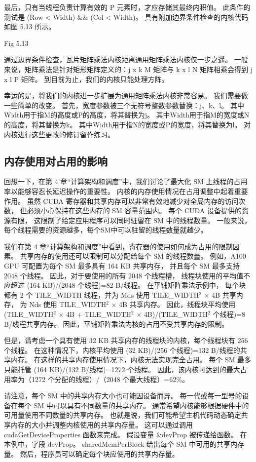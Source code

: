 最后，只有当线程负责计算有效的 P 元素时，才应存储其最终内积值。 
此条件的测试是 (Row < Width) \&\& (Col < Width)。 具有附加边界条件检查的内核代码如图 5.13 所示。

{\color{red} Fig 5.13}

通过边界条件检查，瓦片矩阵乘法内核距离通用矩阵乘法内核仅一步之遥。 
一般来说，矩阵乘法是针对矩形矩阵定义的：j x k M 矩阵与 k x l N 矩阵相乘会得到 j x l P 矩阵。 
到目前为止，我们的内核只能处理方阵。

幸运的是，将我们的内核进一步扩展为通用矩阵乘法内核非常容易。 我们需要做一些简单的改变。 
首先，宽度参数被三个无符号整数参数替换：j、k、l。 其中Width用于指M的高度或P的高度，将其替换为j。 
其中Width用于指M的宽度或N的高度，将其替换为k。 其中Width用于指N的宽度或P的宽度，将其替换为l。 
对内核进行这些更改的修订留作练习。

\subsection{内存使用对占用的影响}
回想一下，在第 4 章“计算架构和调度”中，我们讨论了最大化 SM 上线程的占用率以能够容忍长延迟操作的重要性。 
内核的内存使用情况在占用调整中起着重要作用。 虽然 CUDA 寄存器和共享内存可以非常有效地减少对全局内存的访问次数，
但必须小心保持在这些内存的 SM 容量范围内。 每个 CUDA 设备提供的资源有限，
这限制了给定应用程序可以同时驻留在 SM 中的线程数量。 一般来说，每个线程需要的资源越多，每个SM中可以驻留的线程数量就越少。

我们在第 4 章“计算架构和调度”中看到，寄存器的使用如何成为占用的限制因素。 
共享内存的使用还可以限制可以分配给每个 SM 的线程数量。 例如，A100 GPU 可配置为每个 SM 最多具有 164 KB 共享内存，
并且每个 SM 最多支持 2048 个线程。 因此，对于要使用的所有 2048 个线程槽，
线程块使用的平均值不应超过 (164 KB)/(2048 个线程)=82 B/线程。 在平铺矩阵乘法示例中，
每个块都有 2 个 TILE\_WIDTH 线程，并为 Mds 使用 TILE\_WIDTH$^2$ × 4B 共享内存，
为 Nds 使用 TILE\_WIDTH$^2$ × 4B 共享内存。 
因此，线程块平均使用 (TILE\_WIDTH$^2$ × 4B + TILE\_WIDTH$^2$ × 4B)/(TILE\_WIDTH$^2$ 个线程)=8 B/线程共享内存。 
因此，平铺矩阵乘法内核的占用不受共享内存的限制。

但是，请考虑一个具有使用 32 KB 共享内存的线程块的内核，每个线程块有 256 个线程。 
在这种情况下，内核平均使用 (32 KB)/(256 个线程)=132 B/线程的共享内存。 
在这样的共享内存使用情况下，内核无法实现完全占用。 每个 SM 最多只能托管 (164 KB)/(132 B/线程)=1272 个线程。 
因此，该内核可达到的最大占用率为（1272 个分配的线程）/（2048 个最大线程）=62\%。

请注意，每个 SM 中的共享内存大小也可能因设备而异。 每一代或每一型号的设备在每个 SM 中可以具有不同数量的共享内存。 
通常希望内核能够根据硬件中的可用量使用不同数量的共享内存。 
也就是说，我们可能希望主机代码动态确定共享内存的大小并调整内核使用的共享内存量。 
这可以通过调用 cudaGetDeviceProperties 函数来完成。 假设变量 \&devProp 被传递给函数。 
在本例中，字段 devProp。 sharedMemPerBlock 给出每个 SM 中可用的共享内存量。 
然后，程序员可以确定每个块应使用的共享内存量。

